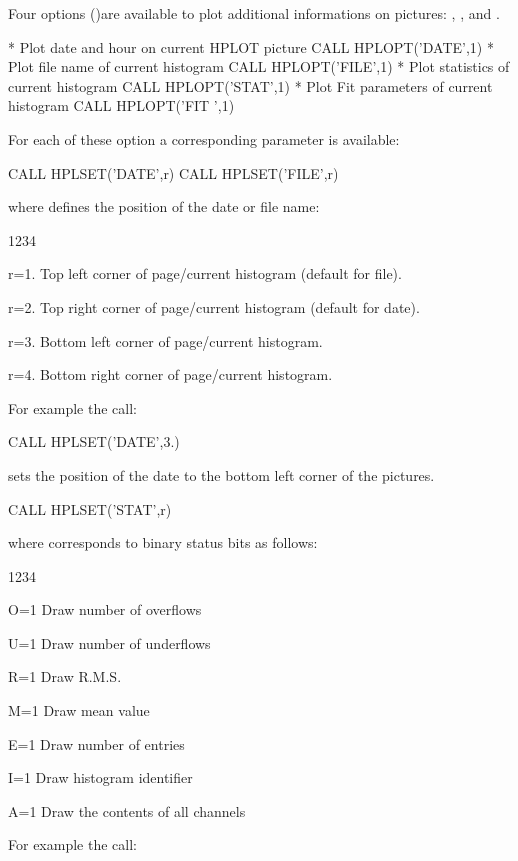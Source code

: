 Four options ()are available to plot additional informations on 
\HPLOT{} pictures: , ,  and .
\begin{XMP}
* Plot date and hour on current HPLOT picture
      CALL HPLOPT('DATE',1)
* Plot file name of current histogram
      CALL HPLOPT('FILE',1)
* Plot statistics of current histogram
      CALL HPLOPT('STAT',1)
* Plot Fit parameters of current histogram
      CALL HPLOPT('FIT ',1)
\end{XMP}
For each of these option a corresponding  parameter is available:
\begin{XMP}
      CALL HPLSET('DATE',r)
      CALL HPLSET('FILE',r)
\end{XMP}
where  defines the position of the date or file name:
\begin{DLtt}{1234}
\item[r=1.] Top left corner of page/current histogram (default for file).
\item[r=2.] Top right corner of page/current histogram (default for date).
\item[r=3.] Bottom left corner of page/current histogram.
\item[r=4.] Bottom right corner of page/current histogram.
\end{DLtt}
For example the call:
\begin{XMP}
      CALL HPLSET('DATE',3.)
\end{XMP}
sets the position of the date to the bottom left corner of the \HPLOT{} 
pictures.
\begin{XMP}
      CALL HPLSET('STAT',r)
\end{XMP}
where  corresponds to binary status bits  as follows: 
\begin{DLtt}{1234}
\item[O=1] Draw number of overflows
\item[U=1] Draw number of underflows
\item[R=1] Draw R.M.S.
\item[M=1] Draw mean value
\item[E=1] Draw number of entries
\item[I=1] Draw histogram identifier
\item[A=1] Draw the contents of all channels
\end{DLtt}
For example the call:
